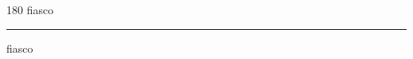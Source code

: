 
\begin{frame}
\begin{center}
\begin{turn}{180}
{\fontsize{2.5cm}{1em}\selectfont fiasco}
\end{turn}
\vspace{1em}\par  
\hrule
\vspace{1em}\par  
{\fontsize{2.5cm}{1em}\selectfont fiasco}
\end{center}
\end{frame}

